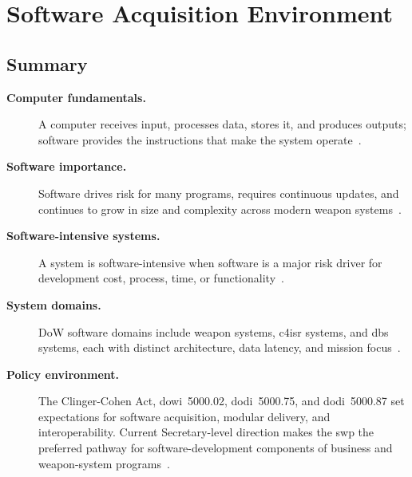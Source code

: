 \documentclass[../main.tex]{subfiles}
\begin{document}
\section{Software Acquisition Environment}

\subsection{Summary}
\begin{description}
  \item[\textbf{Computer fundamentals.}] A computer receives input, processes data, stores it, and produces outputs; software provides the instructions that make the system operate~\autocite{edo-3-4-1-software-acquisition-environment-2025}.
  \item[\textbf{Software importance.}] Software drives risk for many programs, requires continuous updates, and continues to grow in size and complexity across modern weapon systems~\autocite{edo-3-4-1-software-acquisition-environment-2025}.
  \item[\textbf{Software-intensive systems.}] A system is software-intensive when software is a major risk driver for development cost, process, time, or functionality~\autocite{edo-3-4-1-software-acquisition-environment-2025}.
  \item[\textbf{System domains.}] DoW software domains include weapon systems, \ac{c4isr} systems, and \ac{dbs} systems, each with distinct architecture, data latency, and mission focus~\autocite{edo-3-4-1-software-acquisition-environment-2025}.
  \item[\textbf{Policy environment.}] The Clinger-Cohen Act, \ac{dowi}~5000.02, \ac{dodi}~5000.75, and \ac{dodi}~5000.87 set expectations for software acquisition, modular delivery, and interoperability. Current Secretary-level direction makes the \ac{swp} the preferred pathway for software-development components of business and weapon-system programs~\autocite{edo-3-4-1-software-acquisition-environment-2025,DoDI5000-02,DoDI5000-75,DoDI5000-87,SecDef-Software-Acq-2025}.
\end{description}
\end{document}
